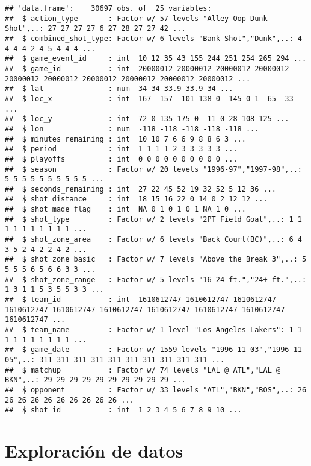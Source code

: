 \documentclass[
]{article}
\begin{document}
\begin{verbatim}
## 'data.frame':    30697 obs. of  25 variables:
##  $ action_type       : Factor w/ 57 levels "Alley Oop Dunk Shot",..: 27 27 27 27 6 27 28 27 27 42 ...
##  $ combined_shot_type: Factor w/ 6 levels "Bank Shot","Dunk",..: 4 4 4 4 2 4 5 4 4 4 ...
##  $ game_event_id     : int  10 12 35 43 155 244 251 254 265 294 ...
##  $ game_id           : int  20000012 20000012 20000012 20000012 20000012 20000012 20000012 20000012 20000012 20000012 ...
##  $ lat               : num  34 34 33.9 33.9 34 ...
##  $ loc_x             : int  167 -157 -101 138 0 -145 0 1 -65 -33 ...
##  $ loc_y             : int  72 0 135 175 0 -11 0 28 108 125 ...
##  $ lon               : num  -118 -118 -118 -118 -118 ...
##  $ minutes_remaining : int  10 10 7 6 6 9 8 8 6 3 ...
##  $ period            : int  1 1 1 1 2 3 3 3 3 3 ...
##  $ playoffs          : int  0 0 0 0 0 0 0 0 0 0 ...
##  $ season            : Factor w/ 20 levels "1996-97","1997-98",..: 5 5 5 5 5 5 5 5 5 5 ...
##  $ seconds_remaining : int  27 22 45 52 19 32 52 5 12 36 ...
##  $ shot_distance     : int  18 15 16 22 0 14 0 2 12 12 ...
##  $ shot_made_flag    : int  NA 0 1 0 1 0 1 NA 1 0 ...
##  $ shot_type         : Factor w/ 2 levels "2PT Field Goal",..: 1 1 1 1 1 1 1 1 1 1 ...
##  $ shot_zone_area    : Factor w/ 6 levels "Back Court(BC)",..: 6 4 3 5 2 4 2 2 4 2 ...
##  $ shot_zone_basic   : Factor w/ 7 levels "Above the Break 3",..: 5 5 5 5 6 5 6 6 3 3 ...
##  $ shot_zone_range   : Factor w/ 5 levels "16-24 ft.","24+ ft.",..: 1 3 1 1 5 3 5 5 3 3 ...
##  $ team_id           : int  1610612747 1610612747 1610612747 1610612747 1610612747 1610612747 1610612747 1610612747 1610612747 1610612747 ...
##  $ team_name         : Factor w/ 1 level "Los Angeles Lakers": 1 1 1 1 1 1 1 1 1 1 ...
##  $ game_date         : Factor w/ 1559 levels "1996-11-03","1996-11-05",..: 311 311 311 311 311 311 311 311 311 311 ...
##  $ matchup           : Factor w/ 74 levels "LAL @ ATL","LAL @ BKN",..: 29 29 29 29 29 29 29 29 29 29 ...
##  $ opponent          : Factor w/ 33 levels "ATL","BKN","BOS",..: 26 26 26 26 26 26 26 26 26 26 ...
##  $ shot_id           : int  1 2 3 4 5 6 7 8 9 10 ...
\end{verbatim}

\hypertarget{exploraciuxf3n-de-datos}{%
\section{\texorpdfstring{\textbf{Exploración de
datos}}{Exploración de datos}}\label{exploraciuxf3n-de-datos}}
\end{document}
